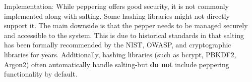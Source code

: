 
Implementation: While peppering offers good security, it is not commonly implemented along with salting. Some hashing libraries might not directly support it. The main downside is that the pepper needs to be managed securely and accessible to the system. This is due to historical standards in that salting has been formally recommended by the NIST, OWASP, and cryptographic libraries for years. Additionally, hashing libraries (such as bcrypt, PBKDF2, Argon2) often automatically handle salting-but \textbf{do not} include peppering functionality by default.


